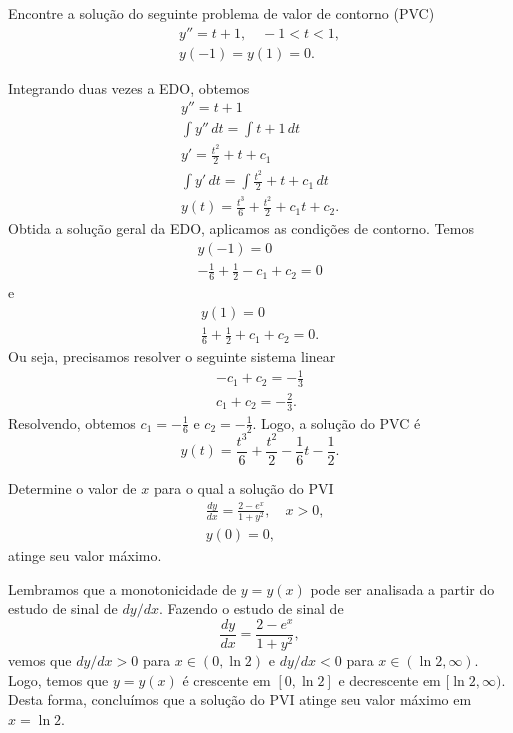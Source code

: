 \begin{exeresol}
  Encontre a solução do seguinte problema de valor de contorno (PVC)
  \begin{gather}
    y'' = t + 1,\quad -1 < t < 1, \\
    y(-1) = y(1) = 0.
  \end{gather}
\end{exeresol}
\begin{resol}
  Integrando duas vezes a EDO, obtemos
  \begin{gather}
    y'' = t + 1\\
    \int y''\,dt = \int t+1\,dt \\
    y' = \frac{t^2}{2} + t + c_1 \\
    \int y'\,dt = \int \frac{t^2}{2} + t + c_1 \,dt \\
    y(t) =  \frac{t^3}{6} + \frac{t^2}{2} + c_1t + c_2.
  \end{gather}
  Obtida a solução geral da EDO, aplicamos as condições de contorno. Temos
  \begin{gather}
    y(-1) = 0 \\
    -\frac{1}{6} + \frac{1}{2} - c_1 + c_2 = 0
  \end{gather}
  e
  \begin{gather}
    y(1) = 0 \\
    \frac{1}{6} + \frac{1}{2} + c_1 + c_2 = 0.
  \end{gather}
  Ou seja, precisamos resolver o seguinte sistema linear
  \begin{align}
    -c_1 + c_2 = -\frac{1}{3} \\
    c_1 + c_2 = -\frac{2}{3}.
  \end{align}
  Resolvendo, obtemos $c_1 = -\frac{1}{6}$ e $c_2 = -\frac{1}{2}$. Logo, a solução do PVC é
  \begin{equation}
    y(t) = \frac{t^3}{6} + \frac{t^2}{2} - \frac{1}{6}t - \frac{1}{2}.
  \end{equation}
\end{resol}

\begin{exeresol}
  Determine o valor de $x$ para o qual a solução do PVI
  \begin{align}
    &\frac{dy}{dx} = \frac{2-e^x}{1 + y^2},\quad x>0,\\
    &y(0)=0,
  \end{align}
  atinge seu valor máximo.
\end{exeresol}
\begin{resol}
  Lembramos que a monotonicidade de $y = y(x)$ pode ser analisada a partir do estudo de sinal de $dy/dx$. Fazendo o estudo de sinal de
  \begin{equation}
    \frac{dy}{dx} = \frac{2-e^x}{1+y^2},
  \end{equation}
  vemos que $dy/dx > 0$ para $x\in (0, \ln 2)$ e $dy/dx < 0$ para $x\in (\ln 2, \infty)$. Logo, temos que $y = y(x)$ é crescente em $[0, \ln 2]$ e decrescente em $[\ln 2, \infty)$. Desta forma, concluímos que a solução do PVI atinge seu valor máximo em $x = \ln 2$.
\end{resol}

